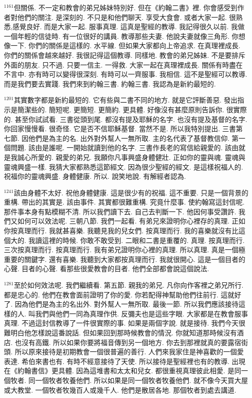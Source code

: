 \documentclass{book}
\begin{document}
$^{1161}$但關係.
不一定和教會的弟兄姊妹特別好.
但在《約翰二書》裡.
你會感受到作者對他們的關注.
是深刻的.
不只是和他們聊天.
享受大食會.
或者大家一起.
很熟悉,感覺良好.
而是大家一起.
服事真理.
這真是聖經的教導.
我記得很久以前.
我做一個年輕的信徒時.
有一位很好的講員.
教導那些夫妻.
他說夫妻就像三角形.
你想像一下.
你們的關係是這樣的.
水平線.
但如果大家都向上帝追求.
在真理裡成長.
你們的關係會越來越好.
我很記得這個教導.
同樣地.
教會的弟兄姊妹.
不是要排斥外面的朋友.
只不過.
只要一信主.
一得救.
大家一起在真理裡成長.
關係有時盡在不言中.
亦有時可以變得很深刻.
有時可以一齊服事.
我相信.
這不是聖經可以教導.
而是我們要去實踐.
我們來到約翰三書.
約翰三書.
我認為是新約最短的.

$^{1201}$其實數字都是新約最短的.
它有些與二書不同的地方.
就是它評斷善惡.
發出指示是簡潔些的.
簡短呢.
更簡短.
更簡約.
更具體.
好像沒有甚麼原則告訴你.
很實際的.
甚至你試試看.
三書從頭到尾.
都沒有提及耶穌的名字.
也沒有提及基督的名字.
你回家慢慢看.
很奇怪.
它是否不信耶穌基督.
當然不是.
所以我特別提出.
三書第七節.
因他們是為主的名.
出外對外幫人一無所取.
主的名代表了基督教信仰.
第一個問題.
該由是誰呢.
一開始就讀到他的名字.
三書作長老的寫信給親愛的.
該由就是我誠心所愛的.
親愛的弟兄.
我願你凡事興盛身體健壯.
正如你的靈與魂.
靈魂與靈魂興盛一樣.
我猜大家都熟悉這節經文.
因為很少聖經的經文.
是這樣祝福人的.
祝福你的靈魂興盛.
身體健康.
所以.
說笑地說.
有解經者認為.

$^{1241}$該由身體不太好.
祝他身體健康.
這是很少有的祝福.
這不重要.
只是一個背景的重構.
帶出的其實是.
該由事件.
其實都很難重構.
究竟什麼事.
使約翰寫這封信呢.
那件事本身有點模糊不清.
所以我們讀下去.
自己去判斷一下.
他因何事受讚許.
我們又如何可以效法呢.
三朝八節.
我們一起看.
有弟兄來證明你心裡存的真理.
正如你按真理而行.
我就甚喜樂.
我聽見我的兒女們.
按真理而行.
我的喜樂就沒有比這個大的.
我讀這裡的時候.
你敢不敢受到.
二眼和二書是重覆的.
真理.
按真理而行.
三次按真理而行.
按真理而行.
我有弟兄證明你心裡的真理.
所以真理.
真是一個極重要的關鍵字.
還有喜樂.
我聽到大家都按真理而行.
我就很開心.
這是一個目者的心聲.
目者的心聲.
看那些很愛教會的目者.
他們全部都會說這個說法.

$^{1281}$至於如何效法呢.
我們繼續看.
第五節.
親我的弟兄.
凡你向作客裡之弟兄所行.
都是忠心的.
他們在教會面前證明了你的愛.
你若配得神幫助他們往前行.
這就好了.
因為他們是為主的名出外.
對外幫人一無所取.
最後一節.
所以我們應該接待這樣的人.
叫我們與他們一同為真理作供.
反彌夫也是這些字眼.
大家都是在教會服事真理.
不過這封信教導了一件很實際的事.
如果是兩個字說.
就是接待.
我們今天很難明白他怎樣說這番說話.
但如果回到那時候教會的情況.
你就知道那時候沒有酒店.
也沒有高鐵.
所以如果你要將福音傳到另一個地方.
你去到那裡就真的要露宿街頭.
所以原來接待是初期教會一個很普遍的善行.
人們來我家住是神喜歡的一個愛表達.
希伯來書也有.
有時不經意接待了天使.
所以接待是聖經裡也有的教導.
出現在《約翰書信》更具體.
因為這堆書和太太和兒女.
都很重視真理彼此相愛.
是同一個牧者.
同一個牧者牧養他們.
所以如果是同一個牧者牧養他們.
就不像今天買大屋或大教堂.
一個牧者牧幾百人或幾千人.
他們是散居各地.
那個牧者到處去講道.
\end{document}
